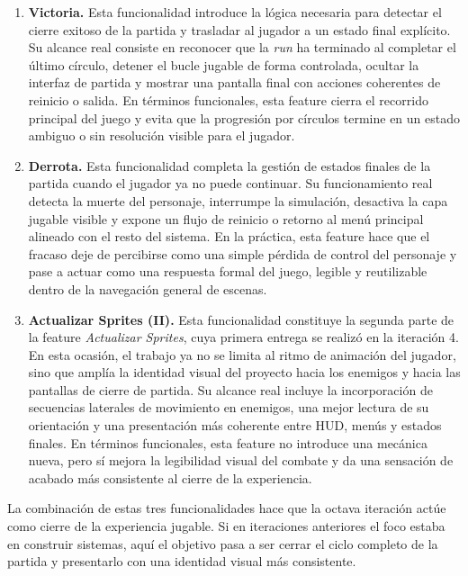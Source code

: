 \begin{enumerate}
\item \textbf{Victoria.} Esta funcionalidad introduce la lógica necesaria para detectar el
cierre exitoso de la partida y trasladar al jugador a un estado final explícito. Su alcance
real consiste en reconocer que la \textit{run} ha terminado al completar el último círculo,
detener el bucle jugable de forma controlada, ocultar la interfaz de partida y mostrar una
pantalla final con acciones coherentes de reinicio o salida. En términos funcionales, esta
feature cierra el recorrido principal del juego y evita que la progresión por círculos
termine en un estado ambiguo o sin resolución visible para el jugador.

\item \textbf{Derrota.} Esta funcionalidad completa la gestión de estados finales de la
partida cuando el jugador ya no puede continuar. Su funcionamiento real detecta la muerte del
personaje, interrumpe la simulación, desactiva la capa jugable visible y expone un flujo de
reinicio o retorno al menú principal alineado con el resto del sistema. En la práctica, esta
feature hace que el fracaso deje de percibirse como una simple pérdida de control del
personaje y pase a actuar como una respuesta formal del juego, legible y reutilizable dentro
de la navegación general de escenas.

\item \textbf{Actualizar Sprites (II).} Esta funcionalidad constituye la segunda parte de
la feature \textit{Actualizar Sprites}, cuya primera entrega se realizó en la iteración 4.
En esta ocasión, el trabajo ya no se limita al ritmo de animación del jugador, sino que
amplía la identidad visual del proyecto hacia los enemigos y hacia las pantallas de cierre de
partida. Su alcance real incluye la incorporación de secuencias laterales de movimiento en
enemigos, una mejor lectura de su orientación y una presentación más coherente entre HUD,
menús y estados finales. En términos funcionales, esta feature no introduce una mecánica
nueva, pero sí mejora la legibilidad visual del combate y da una sensación de acabado más
consistente al cierre de la experiencia.
\end{enumerate}

La combinación de estas tres funcionalidades hace que la octava iteración actúe como cierre
de la experiencia jugable. Si en iteraciones anteriores el foco estaba en construir sistemas,
aquí el objetivo pasa a ser cerrar el ciclo completo de la partida y presentarlo con una
identidad visual más consistente.

